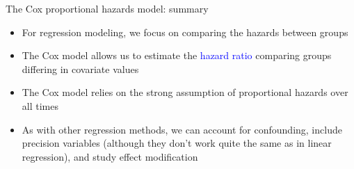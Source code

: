 \documentclass[10pt,t]{beamer}
\begin{document}
\begin{frame}{The Cox proportional hazards model: summary}
	\begin{itemize}
		\item For regression modeling, we focus on comparing the hazards between groups
		\item The Cox model allows us to estimate the \textcolor{blue}{hazard ratio} comparing groups differing in covariate values
		\item The Cox model relies on the strong assumption of proportional hazards over all times
		\item As with other regression methods, we can account for confounding, include precision variables (although they don't work quite the same as in linear regression), and study effect modification
	\end{itemize}
\end{frame}
%
%
\end{document}

